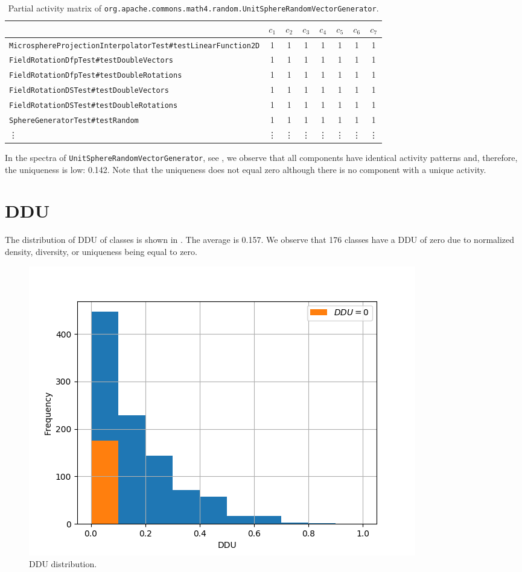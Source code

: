 \documentclass[twoside,a4paper,11pt]{memoir}
\begin{document}
\begin{table}[]
\scriptsize
\centering
\caption{Partial activity matrix of \texttt{org.\-apache.\-commons.\-math4.\-random.\-Unit\-Sphere\-Random\-Vector\-Generator}.}
\label{tab:unitsphere}
\begin{tabular}{l|ccccccc}
 & $c_1$ & $c_2$ & $c_3$ & $c_4$ & $c_5$ & $c_6$ & $c_7$ \\ \hline
\texttt{MicrosphereProjectionInterpolatorTest\#testLinearFunction2D} & 1 & 1 & 1 & 1 & 1 & 1 & 1 \\
\texttt{FieldRotationDfpTest\#testDoubleVectors} & 1 & 1 & 1 & 1 & 1 & 1 & 1 \\
\texttt{FieldRotationDfpTest\#testDoubleRotations} & 1 & 1 & 1 & 1 & 1 & 1 & 1 \\
\texttt{FieldRotationDSTest\#testDoubleVectors} & 1 & 1 & 1 & 1 & 1 & 1 & 1 \\
\texttt{FieldRotationDSTest\#testDoubleRotations} & 1 & 1 & 1 & 1 & 1 & 1 & 1 \\
\texttt{SphereGeneratorTest\#testRandom} & 1 & 1 & 1 & 1 & 1 & 1 & 1 \\
\vdots & \vdots & \vdots & \vdots & \vdots & \vdots & \vdots & \vdots
\end{tabular}
\end{table}

In the spectra of \texttt{Unit\-Sphere\-Random\-Vector\-Generator}, see , we observe that all components have identical activity patterns and, therefore, the uniqueness is low: 0.142.
Note that the uniqueness does not equal zero although there is no component with a unique activity.

\section{DDU}

The distribution of DDU of classes is shown in .
The average is 0.157.
We observe that 176 classes have a DDU of zero due to normalized density, diversity, or uniqueness being equal to zero.

\begin{figure}
    \centering
    \includegraphics[width=\linewidth]{figures/histogram_ddu}
    \caption{DDU distribution.}
    \label{fig:ddu}
\end{figure}
\end{document}
